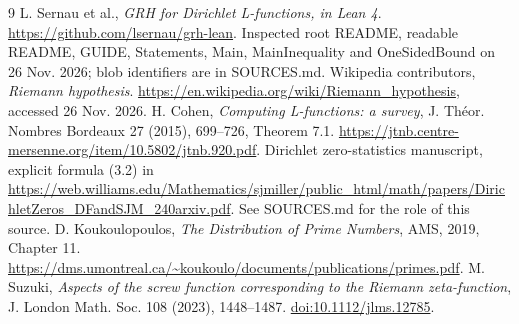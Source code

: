 \documentclass[11pt]{article}
\begin{document}
\begin{thebibliography}{9}
 L. Sernau et al., \emph{GRH for Dirichlet L-functions, in Lean 4}. \url{https://github.com/lsernau/grh-lean}. Inspected root README, readable README, GUIDE, Statements, Main, MainInequality and OneSidedBound on 26 Nov. 2026; blob identifiers are in SOURCES.md.
 Wikipedia contributors, \emph{Riemann hypothesis}. \url{https://en.wikipedia.org/wiki/Riemann_hypothesis}, accessed 26 Nov. 2026.
 H. Cohen, \emph{Computing L-functions: a survey}, J. Th\'eor. Nombres Bordeaux 27 (2015), 699--726, Theorem 7.1. \url{https://jtnb.centre-mersenne.org/item/10.5802/jtnb.920.pdf}.
 Dirichlet zero-statistics manuscript, explicit formula (3.2) in \url{https://web.williams.edu/Mathematics/sjmiller/public_html/math/papers/DirichletZeros_DFandSJM_240arxiv.pdf}. See SOURCES.md for the role of this source.
 D. Koukoulopoulos, \emph{The Distribution of Prime Numbers}, AMS, 2019, Chapter 11. \url{https://dms.umontreal.ca/~koukoulo/documents/publications/primes.pdf}.
 M. Suzuki, \emph{Aspects of the screw function corresponding to the Riemann zeta-function}, J. London Math. Soc. 108 (2023), 1448--1487. \href{https://doi.org/10.1112/jlms.12785}{doi:10.1112/jlms.12785}.
\end{thebibliography}
\end{document}
